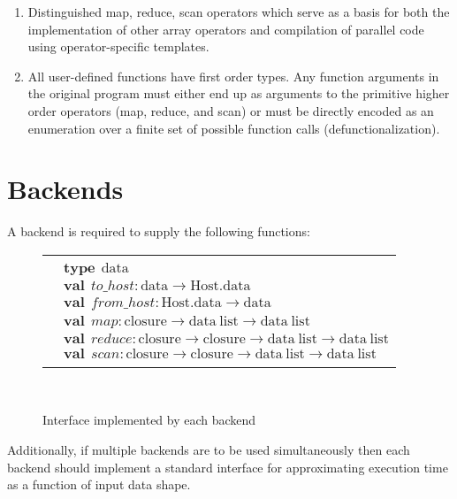 \documentclass[preprint]{sigplanconf}
\begin{document}
\begin{enumerate}
\item Distinguished map, reduce, scan operators which serve as a basis for both the implementation of other array 
 operators and compilation of parallel code using operator-specific templates.  
\item All user-defined functions have first order types. Any function arguments in the original program 
 must either end up as arguments to the primitive higher order operators (map, reduce, and scan) or
 must be directly encoded as an enumeration over a finite set of possible function calls (defunctionalization). 
\end{enumerate}

\section{Backends} 
A backend is required to supply the following functions: 
\begin{figure}[h!]
\begin{tabular}{| m{0.001cm}m{7.8cm} |}
 \hline 
& \\[0.1pt]
& $\mathbf{type} ~~ \mathrm{data}$   \\[3pt]
& $\mathbf{val} ~~ \mathit{to\_host}  : \mathrm{data} \rightarrow  \mathrm{Host.data}$ \\
& $\mathbf{val} ~~ \mathit{from\_host}  : \mathrm{Host.data}  \rightarrow \mathrm{data}$ \\[3pt]
& $\mathbf{val} ~~ \mathit{map}  : \mathrm{closure}  \rightarrow \mathrm{data ~ list}  \rightarrow \mathrm{data~ list} $ \\
& $\mathbf{val} ~~ \mathit{reduce}  : \mathrm{closure}  \rightarrow \mathrm{closure}  \rightarrow \mathrm{data~ list}  \rightarrow \mathrm{data ~ list}$ \\ 
& $\mathbf{val} ~~ \mathit{scan}  : \mathrm{closure}  \rightarrow \mathrm{closure}  \rightarrow  \mathrm{data  ~ list}  \rightarrow \mathrm{data ~ list}$ \\
& \\
 \hline
\end{tabular}\\[4pt]
\caption{Interface implemented by each backend}
\end{figure}

Additionally, if multiple backends are to be used simultaneously then each backend should implement a standard interface for approximating
execution time as a function of input data shape. 
\end{document}
